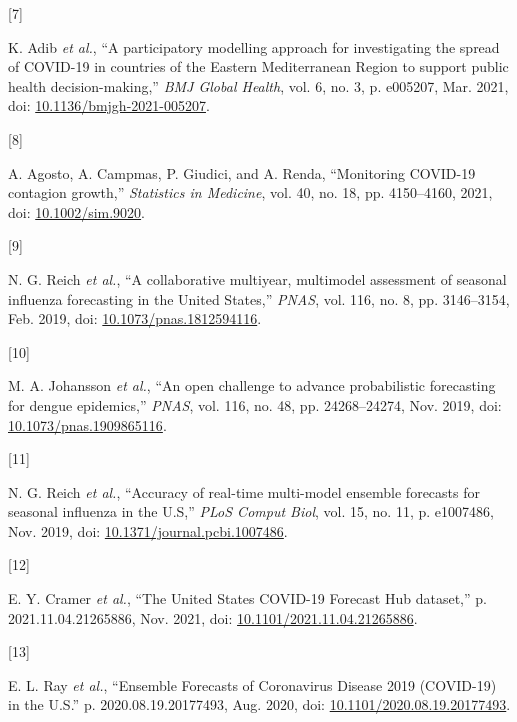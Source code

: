 \documentclass[
]{article}
\newlength{\cslhangindent}
\newlength{\csllabelwidth}
\newlength{\cslentryspacingunit} %
\newenvironment{CSLReferences}[2] %
 {%
  \setlength{\parindent}{0pt}
  \ifodd #1
  \let\oldpar\par
  \def\par{\hangindent=\cslhangindent\oldpar}
  \fi
  \setlength{\parskip}{#2\cslentryspacingunit}
 }%
 {}
\newcommand{\CSLLeftMargin}[1]{\parbox[t]{\csllabelwidth}{#1}}
\newcommand{\CSLRightInline}[1]{\parbox[t]{\linewidth - \csllabelwidth}{#1}\break}
\begin{document}
\begin{CSLReferences}{0}{0}
\leavevmode{}%
\CSLLeftMargin{{[}7{]} }
\CSLRightInline{K. Adib \emph{et al.}, {``A participatory modelling approach for investigating the spread of {COVID-19} in countries of the {Eastern Mediterranean Region} to support public health decision-making,''} \emph{BMJ Global Health}, vol. 6, no. 3, p. e005207, Mar. 2021, doi: \href{https://doi.org/10.1136/bmjgh-2021-005207}{10.1136/bmjgh-2021-005207}.}

\leavevmode{}%
\CSLLeftMargin{{[}8{]} }
\CSLRightInline{A. Agosto, A. Campmas, P. Giudici, and A. Renda, {``Monitoring {COVID-19} contagion growth,''} \emph{Statistics in Medicine}, vol. 40, no. 18, pp. 4150--4160, 2021, doi: \href{https://doi.org/10.1002/sim.9020}{10.1002/sim.9020}.}

\leavevmode{}%
\CSLLeftMargin{{[}9{]} }
\CSLRightInline{N. G. Reich \emph{et al.}, {``A collaborative multiyear, multimodel assessment of seasonal influenza forecasting in the {United States},''} \emph{PNAS}, vol. 116, no. 8, pp. 3146--3154, Feb. 2019, doi: \href{https://doi.org/10.1073/pnas.1812594116}{10.1073/pnas.1812594116}.}

\leavevmode{}%
\CSLLeftMargin{{[}10{]} }
\CSLRightInline{M. A. Johansson \emph{et al.}, {``An open challenge to advance probabilistic forecasting for dengue epidemics,''} \emph{PNAS}, vol. 116, no. 48, pp. 24268--24274, Nov. 2019, doi: \href{https://doi.org/10.1073/pnas.1909865116}{10.1073/pnas.1909865116}.}

\leavevmode{}%
\CSLLeftMargin{{[}11{]} }
\CSLRightInline{N. G. Reich \emph{et al.}, {``Accuracy of real-time multi-model ensemble forecasts for seasonal influenza in the {U}.{S},''} \emph{PLoS Comput Biol}, vol. 15, no. 11, p. e1007486, Nov. 2019, doi: \href{https://doi.org/10.1371/journal.pcbi.1007486}{10.1371/journal.pcbi.1007486}.}

\leavevmode{}%
\CSLLeftMargin{{[}12{]} }
\CSLRightInline{E. Y. Cramer \emph{et al.}, {``The {United States COVID-19 Forecast Hub} dataset,''} p. 2021.11.04.21265886, Nov. 2021, doi: \href{https://doi.org/10.1101/2021.11.04.21265886}{10.1101/2021.11.04.21265886}.}

\leavevmode{}%
\CSLLeftMargin{{[}13{]} }
\CSLRightInline{E. L. Ray \emph{et al.}, {``Ensemble {Forecasts} of {Coronavirus Disease} 2019 ({COVID-19}) in the {U}.{S}.''} p. 2020.08.19.20177493, Aug. 2020, doi: \href{https://doi.org/10.1101/2020.08.19.20177493}{10.1101/2020.08.19.20177493}.}


\end{CSLReferences}
\end{document}
